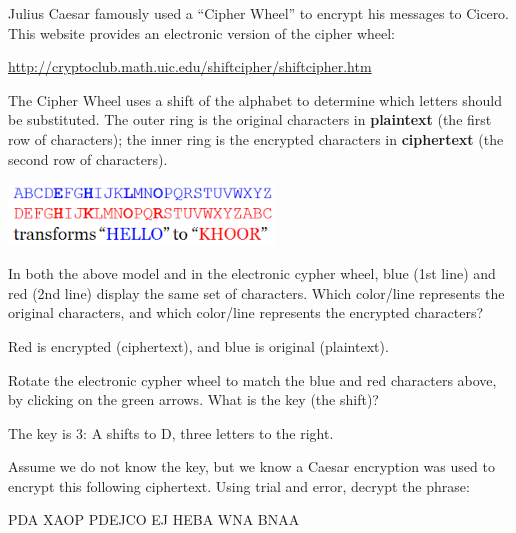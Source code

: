 

Julius Caesar famously used a ``Cipher Wheel'' to encrypt his messages to Cicero.
This website provides an electronic version of the cipher wheel:

\begin{center}
\url{http://cryptoclub.math.uic.edu/shiftcipher/shiftcipher.htm}
\end{center}

The Cipher Wheel uses a shift of the alphabet to determine which letters should be substituted.
The outer ring is the original characters in \textbf{plaintext} (the first row of characters); the inner ring is the encrypted characters in \textbf{ciphertext} (the second row of characters).

\begin{center}
\includegraphics[height=0.65in]{CSP/caesar1.png}
\end{center}



\Q In both the above model and in the electronic cypher wheel, blue (1st line) and red (2nd line) display the same set of characters.
Which color/line represents the original characters, and which color/line represents the encrypted characters?

\begin{answer}[3em]
Red is encrypted (ciphertext), and blue is original (plaintext).
\end{answer}


\Q Rotate the electronic cypher wheel to match the blue and red characters above, by clicking on the green arrows.
What is the key (the shift)?

\begin{answer}[3em]
The key is 3: A shifts to D, three letters to the right.
\end{answer}


\Q Assume we do not know the key, but we know a Caesar encryption was used to encrypt this following ciphertext.
Using trial and error, decrypt the phrase:

\begin{center}
PDA XAOP PDEJCO EJ HEBA WNA BNAA
\end{center}

